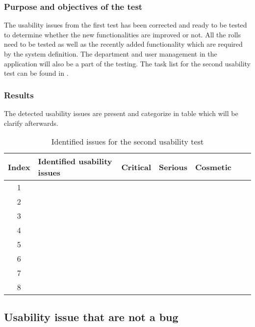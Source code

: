 \subsubsection{Purpose and objectives of the test}
The usability issues from the first test has been corrected and ready to be tested to determine whether the new functionalities are improved or not. 
All the rolls need to be tested as well as the recently added functionality which are required by the system definition. 
The department and user management in the application will also be a part of the testing. The task list for the second usability test can be found in .

\subsubsection{Results}

The detected usability issues are present and categorize in table 
 which will be clarify afterwards. 

\begin{table}[H]
	\begin{center}
	\begin{tabular}{| c | m{21em} | c | c | c | c | c |}
		\hline
		Index & \textbf{Identified usability issues} & Critical  & Serious & Cosmetic \\
		\hline
		 1 &  &  &  &  \\
		\hline
		 2 &  &  &  & \\
		\hline
		 3 &  & & &  \\
		\hline
		4 & &  & & \\
		\hline
		5 & &  &  &  \\
		\hline
		6 & &  &  & \\
		\hline
		7 &  & & &  \\
		\hline
		8 &  &  &  &  \\
		\hline
	\end{tabular}
	\end{center}
	\caption{Identified issues for the second usability test}\label{tab:utest2}
\end{table}




\subsection{Usability issue that are not a bug}




